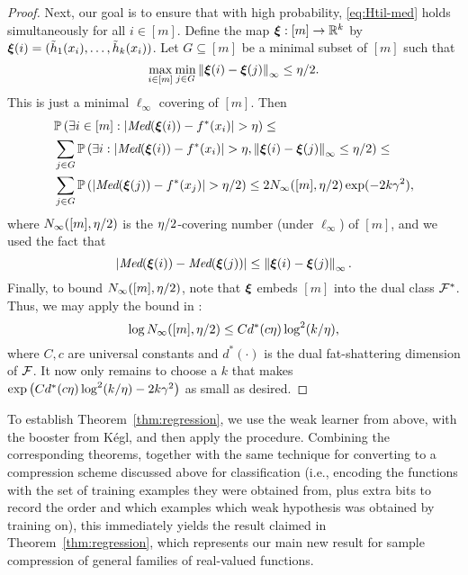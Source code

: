 \begin{proof}
Next, our goal is to ensure that
with high probability,
\eqref{eq:Htil-med} holds simultaneously for all
${i\in[m]}$.
Define the map $\boldsymbol{\xi}:[m]\to\mathbb{R}^k$
by $\boldsymbol{\xi}(i)=(\tilde{h}_{1}(x_i),\ldots,\tilde{h}_{k}(x_i))$.
Let
$G \subseteq[m]$
be a minimal subset of $[m]$ such that 
$$\max\limits_{i \in [m]} \min\limits_{j \in {G}}
\left\Vert \boldsymbol{\xi}(i)-\boldsymbol{\xi}(j) \right\Vert_\infty\le\eta/2
.
$$
This is just a minimal $\ell_\infty$ covering of $[m]$.
Then
\begin{align*}
  &\P\paren{
    \exists
    i
    \in[m]
    :
    |\emph{Med}(\bxi(i))-f^*(x_i)|>\dev
  }\le\\
  &\sum_{j\in G}
  \P\paren{
    \exists i
    :
    |\emph{Med}(\bxi(i))-f^*(x_i)|>\dev , \nrm{\bxi(i)-\bxi(j)}_\infty\le\dev/2
  }
  \le\\
  &
  \sum_{j\in G}
  \P\paren{
    |\emph{Med}(\bxi(j))-f^*(x_j)|>\dev /2
  }
  \le 2N_\infty([m],\dev/2)\exp(-2k\adv^2),
\end{align*}
where $N_\infty([m],\eta/2)$ is the $\eta /2$-covering number (under $\ell_\infty$)
of $[m]$,
and we used the fact that
$$|\emph{Med}(\boldsymbol{\xi}(i))-\emph{Med}(\boldsymbol{\xi}(j))|\le\left\Vert \boldsymbol{\xi}(i)-\boldsymbol{\xi}(j) \right\Vert_\infty.$$
Finally, to bound $N_\infty([m],\eta/2)$, note that
$\boldsymbol{\xi}$
embeds
$[m]$
into the dual
class
$\mathcal{F}^*$.
Thus, we may apply
the bound in \cite[Display (1.4)]{MR2247969}:
$$
\log N_\infty([m],\eta/2)\le C d^*(c\eta)\log^2(k/\eta),
$$
where $C,c$ are universal constants and $d^*(\cdot)$
is the dual fat-shattering dimension of $\mathcal{F}$.
It now only remains to choose a $k$
that makes
$\exp\left( C d^*(c\eta)\log^2(k/\eta)-2k\gamma^2 \right)$
as small as desired.
\end{proof}

To establish Theorem~\ref{thm:regression}, 
we use the weak learner from above, with the booster  from K\'{e}gl, and then apply the  procedure. 
Combining the corresponding theorems, together with the same technique for converting to a compression scheme 
discussed above for classification (i.e., encoding the functions with the set of training examples they were obtained from, plus extra bits 
to record the order and which examples which weak hypothesis was obtained by training on), 
this immediately yields the result claimed in Theorem~\ref{thm:regression}, 
which represents our main new result for sample compression of general families of real-valued functions.

